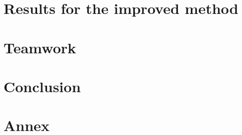 \documentclass{article}
\begin{document}
\section{Results for the improved method}



\section{Teamwork}



\section{Conclusion}


\pagebreak



\clearpage
\section{Annex}


\end{document}
